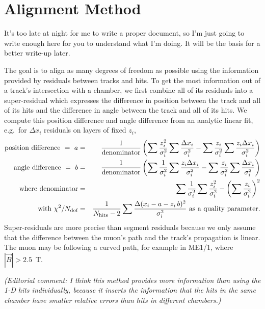 \documentclass[12pt]{article}
\begin{document}
\section{Alignment Method}

It's too late at night for me to write a proper document, so I'm just
going to write enough here for you to understand what I'm doing.  It
will be the basis for a better write-up later.

The goal is to align as many degrees of freedom as possible using the
information provided by residuals between tracks and hits.  To get the
most information out of a track's intersection with a chamber, we
first combine all of its residuals into a super-residual which
expresses the difference in position between the track and all of its
hits and the difference in angle between the track and all of its
hits.  We compute this position difference and angle difference from
an analytic linear fit, e.g.\ for $\Delta x_i$ residuals on layers of
fixed $z_i$,
\begin{eqnarray}
\mbox{position difference } = \mbox{ }a &=& \frac{1}{\mbox{denominator}} \left(\sum\frac{z_i^2}{\sigma_i^2} \sum\frac{\Delta x_i}{\sigma_i^2} - \sum\frac{z_i}{\sigma_i^2} \sum\frac{z_i \Delta x_i}{\sigma_i^2}\right) \\
\mbox{angle difference } = \mbox{ }b &=& \frac{1}{\mbox{denominator}} \left(\sum\frac{1}{\sigma_i^2} \sum\frac{z_i \Delta x_i}{\sigma_i^2} - \sum\frac{z_i}{\sigma_i^2} \sum\frac{\Delta x_i}{\sigma_i^2}\right) \\
\mbox{where denominator} &=& \sum\frac{1}{\sigma_i^2}
\sum\frac{z_i^2}{\sigma_i^2} - \left(\sum\frac{z_i}{\sigma_i^2}\right)^2 \\
\mbox{with } \chi^2/N_{\mbox{\scriptsize dof}} &=& \frac{1}{N_{\mbox{\scriptsize hits}} - 2} \sum \frac{\Delta (x_i - a - z_i \, b)^2}{\sigma_i^2} \mbox{ as a quality parameter.}
\label{eqn:superresiduals}
\end{eqnarray}
Super-residuals are more precise than segment residuals because we
only assume that the difference between the muon's path and the
track's propagation is linear.  The muon may be following a curved
path, for example in ME1/1, where $|\vec{B}| > 2.5$~T.

{\it (Editorial comment: I think this method provides more information
  than using the 1-D hits individually, because it inserts the
  information that the hits in the same chamber have smaller relative
  errors than hits in different chambers.)}
\end{document}
